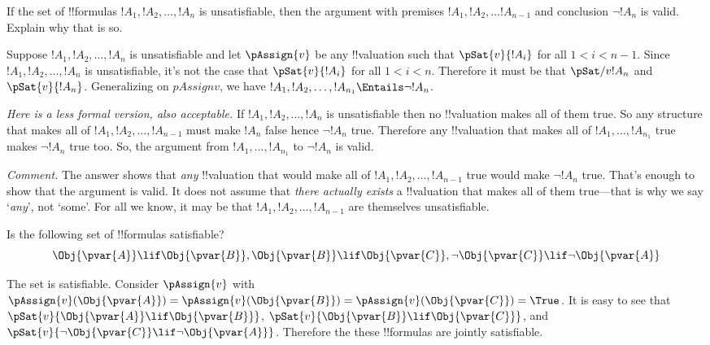 \documentclass[../../../include/open-logic-section]{subfiles}
\begin{document}


\begin{prob}
    If the set of !!{formula}s $!A_1, !A_2,\ldots, !A_n$ is unsatisfiable, 
    then the argument with premises $!A_1,!A_2,\ldots!A_{n-1}$ 
    and conclusion $\lnot !A_n$ is valid. Explain why that is so.

    \begin{ans}
    Suppose $!A_1, !A_2,\ldots, !A_n$ is unsatisfiable and 
    let $\pAssign{v}$ be any !!{valuation} such that $\pSat{v}{!A_i}$
    for all $1<i<n-1$. Since $!A_1, !A_2,\ldots, !A_n$ is unsatisfiable,
    it's not the case that $\pSat{v}{!A_i}$ for all  $1<i<n$. Therefore it 
    must be that $\pSat/{v}{!A_n}$ and $\pSat{v}{!A_n}$. Generalizing on $pAssign{v}$,
    we have $!A_1, !A_2,\ldots, !A_{n_1}\Entails \lnot!A_n$.
    
    \emph{Here is a less formal version, also acceptable.} If 
    $!A_1, !A_2,\ldots, !A_n$ is unsatisfiable then no !!{valuation}
    makes all of them true. So any structure that makes all of 
    $!A_1, !A_2,\ldots, !A_{n-1}$ must make $!A_n$ false hence
    $\lnot!A_n$ true. Therefore any !!{valuation} that makes all of 
    $!A_1,\ldots,!A_{n_1}$ true makes $\lnot!A_n$ true too. So, the 
    argument from $!A_1,\ldots,!A_{n_1}$ to $\lnot!A_n$ is valid.

    \emph{Comment.} The answer shows that \emph{any} !!{valuation} that
    would make all of $!A_1, !A_2,\ldots, !A_{n-1}$ true would make
    $\lnot!A_n$ true. That's enough to show that the argument is valid.
    It does not assume that \emph{there actually exists} a !!{valuation}
    that makes all of them true---that is why we say `\emph{any}', not
    `some'. For all we know, it may be that 
    $!A_1, !A_2,\ldots, !A_{n-1}$ are themselves unsatisfiable.

    \end{ans}
\end{prob}

\begin{prob}
    \citep[1.1 item 4]{MacFarlane-2020-PhilosophicalLogicContemporary}
    Is the following set of !!{formula}s satisfiable?
    $$
    \Obj{\pvar{A}}\lif\Obj{\pvar{B}}, 
    \Obj{\pvar{B}}\lif\Obj{\pvar{C}},
    \lnot\Obj{\pvar{C}}\lif\lnot\Obj{\pvar{A}}
    $$

    \begin{ans}
    The set is satisfiable. Consider $\pAssign{v}$ with 
    $\pAssign{v}(\Obj{\pvar{A}})=\pAssign{v}(\Obj{\pvar{B}})
    =\pAssign{v}(\Obj{\pvar{C}})=\True$.
    It is easy to see that $\pSat{v}{\Obj{\pvar{A}}\lif\Obj{\pvar{B}}}$, 
    $\pSat{v}{\Obj{\pvar{B}}\lif\Obj{\pvar{C}}}$, and
    $\pSat{v}{\lnot\Obj{\pvar{C}}\lif\lnot\Obj{\pvar{A}}}$. Therefore the 
    these !!{formula}s are jointly satisfiable.
    \end{ans}
\end{prob}
\end{document}
